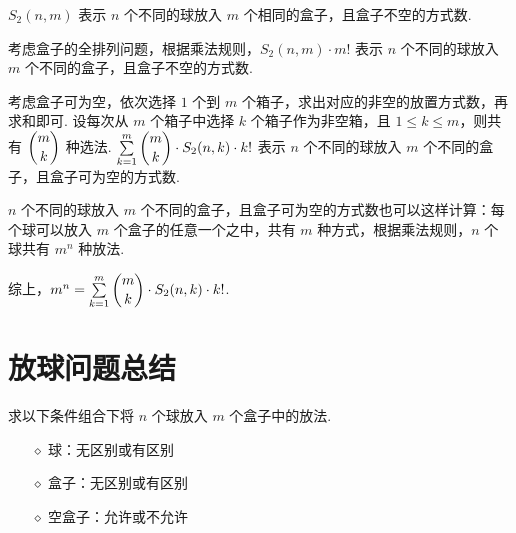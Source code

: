 \documentclass[cn, hazy, blue, normal, 12pt]{elegantnote}
\begin{document}
\begin{solution}[print=true]

    $S_2(n,m)$ 表示 $n$ 个不同的球放入 $m$ 个相同的盒子，且盒子不空的方式数.

    考虑盒子的全排列问题，根据乘法规则，$S_2(n,m) \cdot m!$ 表示 $n$ 个不同的球放入 $m$ 个不同的盒子，且盒子不空的方式数.

    考虑盒子可为空，依次选择 $1$ 个到 $m$ 个箱子，求出对应的非空的放置方式数，再求和即可. 设每次从 $m$ 个箱子中选择 $k$ 个箱子作为非空箱，且 $1 \leq k \leq m$，则共有 $\dbinom{m}{k}$ 种选法. $\sum\limits_{k=1}^{m} {\dbinom{m}{k} \cdot S_2(n,k) \cdot k!}$ 表示 $n$ 个不同的球放入 $m$ 个不同的盒子，且盒子可为空的方式数.

    $n$ 个不同的球放入 $m$ 个不同的盒子，且盒子可为空的方式数也可以这样计算：每个球可以放入 $m$ 个盒子的任意一个之中，共有 $m$ 种方式，根据乘法规则，$n$ 个球共有 $m^n$ 种放法.

    综上，$m^n = \sum\limits_{k=1}^{m} {\dbinom{m}{k} \cdot S_2(n,k) \cdot k!}$.

\end{solution}


\section{放球问题总结}

\begin{exercise}

    求以下条件组合下将 $n$ 个球放入 $m$ 个盒子中的放法.
    \begin{itemize}
        \item[$\diamond$] 球：无区别或有区别
        \item[$\diamond$] 盒子：无区别或有区别
        \item[$\diamond$] 空盒子：允许或不允许
    \end{itemize}

\end{exercise}
\end{document}
